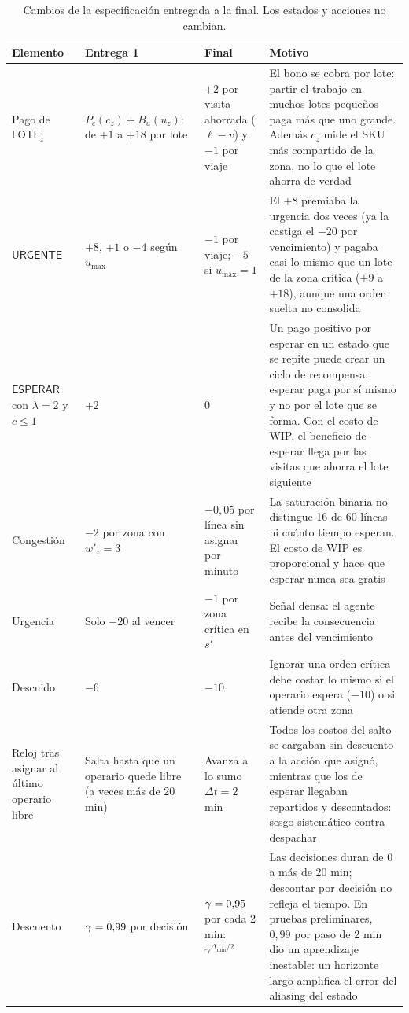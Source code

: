 \documentclass[11pt,letterpaper]{article}
\newcommand{\LOTE}[1]{\mathsf{LOTE}_{#1}}
\newcommand{\URG}{\mathsf{URGENTE}}
\newcommand{\ESP}{\mathsf{ESPERAR}}
\newcommand{\umax}{u_{\max}}
\begin{document}
\begin{table}[H]
\centering\footnotesize
\begin{tabularx}{\textwidth}{@{}P{2.3cm}P{3.6cm}P{3.6cm}L@{}}
\toprule
\textbf{Elemento} & \textbf{Entrega 1} & \textbf{Final} & \textbf{Motivo} \\
\midrule
Pago de $\LOTE{z}$ & $P_c(c_z)+B_u(u_z)$: de $+1$ a $+18$ por lote & $+2$ por visita ahorrada ($\ell-v$) y $-1$ por viaje & El bono se cobra por lote: partir el trabajo en muchos lotes pequeños paga más que uno grande. Además $c_z$ mide el SKU más compartido de la zona, no lo que el lote ahorra de verdad \\
$\URG$ & $+8$, $+1$ o $-4$ según $\umax$ & $-1$ por viaje; $-5$ si $\umax=1$ & El $+8$ premiaba la urgencia dos veces (ya la castiga el $-20$ por vencimiento) y pagaba casi lo mismo que un lote de la zona crítica ($+9$ a $+18$), aunque una orden suelta no consolida \\
$\ESP$ con $\lambda=2$ y $c\le1$ & $+2$ & $0$ & Un pago positivo por esperar en un estado que se repite puede crear un ciclo de recompensa: esperar paga por sí mismo y no por el lote que se forma. Con el costo de WIP, el beneficio de esperar llega por las visitas que ahorra el lote siguiente \\
Congestión & $-2$ por zona con $w'_z=3$ & $-0{,}05$ por línea sin asignar por minuto & La saturación binaria no distingue 16 de 60 líneas ni cuánto tiempo esperan. El costo de WIP es proporcional y hace que esperar nunca sea gratis \\
Urgencia & Solo $-20$ al vencer & $-1$ por zona crítica en $s'$ & Señal densa: el agente recibe la consecuencia antes del vencimiento \\
Descuido & $-6$ & $-10$ & Ignorar una orden crítica debe costar lo mismo si el operario espera ($-10$) o si atiende otra zona \\
Reloj tras asignar al último operario libre & Salta hasta que un operario quede libre (a veces más de 20 min) & Avanza a lo sumo $\Delta t=2$ min & Todos los costos del salto se cargaban sin descuento a la acción que asignó, mientras que los de esperar llegaban repartidos y descontados: sesgo sistemático contra despachar \\
Descuento & $\gamma=0{,}99$ por decisión & $\gamma=0{,}95$ por cada 2 min: $\gamma^{\Delta_{\min}/2}$ & Las decisiones duran de 0 a más de 20 min; descontar por decisión no refleja el tiempo. En pruebas preliminares, $0{,}99$ por paso de 2 min dio un aprendizaje inestable: un horizonte largo amplifica el error del aliasing del estado \\
\bottomrule
\end{tabularx}
\caption{Cambios de la especificación entregada a la final. Los estados y acciones no cambian.}
\label{tab:cambios}
\end{table}
\end{document}
